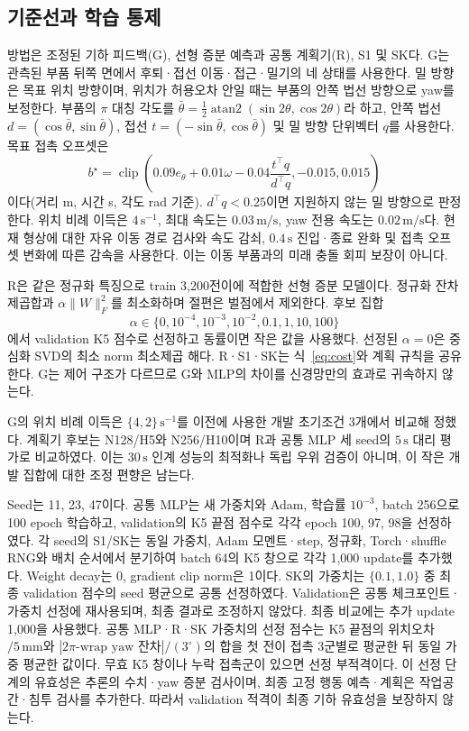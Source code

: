\documentclass[conference,a4paper]{IEEEtran}
\begin{document}
\subsection{기준선과 학습 통제}
방법은 조정된 기하 피드백(G), 선형 증분 예측과 공통 계획기(R), S1 및 SK다.
G는 관측된 부품 뒤쪽 면에서 후퇴·접선 이동·접근·밀기의 네 상태를 사용한다.
밀 방향은 목표 위치 방향이며, 위치가 허용오차 안일 때는 부품의 안쪽 법선 방향으로 yaw를 보정한다.
부품의 $\pi$ 대칭 각도를 $\bar\theta=\tfrac12\operatorname{atan2}(\sin2\theta,\cos2\theta)$라 하고,
안쪽 법선 $d=(\cos\bar\theta,\sin\bar\theta)$, 접선 $t=(-\sin\bar\theta,\cos\bar\theta)$ 및 밀 방향 단위벡터 $q$를 사용한다.
목표 접촉 오프셋은
\begin{equation}
b^\star=\operatorname{clip}\!\left(
0.09e_\theta+0.01\omega-0.04\frac{t^\top q}{d^\top q},
-0.015,0.015\right)
\label{eq:geometry}
\end{equation}
이다(거리 m, 시간 s, 각도 rad 기준).
$d^\top q<0.25$이면 지원하지 않는 밀 방향으로 판정한다.
위치 비례 이득은 $4\,\mathrm{s^{-1}}$, 최대 속도는 $0.03\,\mathrm{m/s}$, yaw 전용 속도는 $0.02\,\mathrm{m/s}$다.
현재 형상에 대한 자유 이동 경로 검사와 속도 감쇠, $0.4\,\mathrm s$ 진입·종료 완화 및 접촉 오프셋 변화에 따른 감속을 사용한다.
이는 이동 부품과의 미래 충돌 회피 보장이 아니다.

R은 같은 정규화 특징으로 train 3,200전이에 적합한 선형 증분 모델이다.
정규화 잔차 제곱합과 $\alpha\lVert W\rVert_F^2$를 최소화하며 절편은 벌점에서 제외한다.
후보 집합
\[
\alpha\in\{0,10^{-4},10^{-3},10^{-2},0.1,1,10,100\}
\]
에서 validation K5 점수로 선정하고 동률이면 작은 값을 사용했다.
선정된 $\alpha=0$은 중심화 SVD의 최소 norm 최소제곱 해다.
R·S1·SK는 식~\eqref{eq:cost}와 계획 규칙을 공유한다.
G는 제어 구조가 다르므로 G와 MLP의 차이를 신경망만의 효과로 귀속하지 않는다.

G의 위치 비례 이득은 $\{4,2\}\,\mathrm{s^{-1}}$를 이전에 사용한 개발 초기조건 3개에서 비교해 정했다.
계획기 후보는 N128/H5와 N256/H10이며 R과 공통 MLP 세 seed의 $5\,\mathrm s$ 대리 평가로 비교하였다.
이는 $30\,\mathrm s$ 인계 성능의 최적화나 독립 우위 검증이 아니며, 이 작은 개발 집합에 대한 조정 편향은 남는다.

Seed는 11, 23, 47이다.
공통 MLP는 새 가중치와 Adam, 학습률 $10^{-3}$, batch 256으로 100 epoch 학습하고,
validation의 K5 끝점 점수로 각각 epoch 100, 97, 98을 선정하였다.
각 seed의 S1/SK는 동일 가중치, Adam 모멘트·step, 정규화, Torch·shuffle RNG와 배치 순서에서 분기하여
batch 64의 K5 창으로 각각 1,000 update를 추가했다.
Weight decay는 0, gradient clip norm은 1이다.
SK의 가중치는 $\{0.1,1.0\}$ 중 최종 validation 점수의 seed 평균으로 공통 선정하였다.
Validation은 공통 체크포인트·가중치 선정에 재사용되며, 최종 결과로 조정하지 않았다.
최종 비교에는 추가 update 1,000을 사용했다.
공통 MLP·R·SK 가중치의 선정 점수는 K5 끝점의 위치오차$/5\,\mathrm{mm}$와
$|2\pi\text{-wrap yaw 잔차}|/(3^\circ)$의 합을 첫 전이 접촉 3군별로 평균한 뒤 동일 가중 평균한 값이다.
무효 K5 창이나 누락 접촉군이 있으면 선정 부적격이다.
이 선정 단계의 유효성은 추론의 수치·yaw 증분 검사이며, 최종 고정 행동 예측·계획은 작업공간·침투 검사를 추가한다.
따라서 validation 적격이 최종 기하 유효성을 보장하지 않는다.
\end{document}
